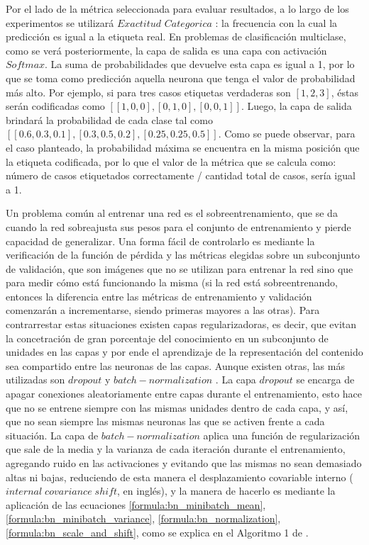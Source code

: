 
 Por el lado de la métrica seleccionada para evaluar resultados, a lo largo de los experimentos se utilizará \(Exactitud\) \(Categorica\) \cite{balanced_accuracy_score}: la frecuencia con la cual la predicción es igual a la etiqueta real. En problemas de clasificación multiclase, como se verá posteriormente, la capa de salida es una capa con activación \(Softmax\). La suma de probabilidades que devuelve esta capa es igual a 1, por lo que se toma como predicción aquella neurona que tenga el valor de probabilidad más alto. 
 Por ejemplo, si para tres casos etiquetas verdaderas son \([1, 2, 3]\), éstas serán codificadas como \([[1, 0, 0], [0, 1, 0], [0, 0, 1]]\). Luego, la capa de salida brindará la probabilidad de cada clase tal como \([[0.6, 0.3, 0.1], [0.3, 0.5, 0.2], [0.25, 0.25, 0.5]]\). Como se puede observar, para el caso planteado, la probabilidad máxima se encuentra en la misma posición que la etiqueta codificada, por lo que el valor de la métrica que se calcula como: número de casos etiquetados correctamente / cantidad total de casos, sería igual a 1.


 Un problema común al entrenar una red es el sobreentrenamiento, que se da cuando la red sobreajusta sus pesos para el conjunto de entrenamiento y pierde capacidad de generalizar. Una forma fácil de controlarlo es mediante la verificación de la función de pérdida y las métricas elegidas sobre un subconjunto de validación, que son imágenes que no se utilizan para entrenar la red sino que para medir cómo está funcionando la misma (si la red está sobreentrenando, entonces la diferencia entre las métricas de entrenamiento y validación comenzarán a incrementarse, siendo primeras mayores a las otras). Para contrarrestar estas situaciones existen capas regularizadoras, es decir, que evitan la concetración de gran porcentaje del conocimiento en un subconjunto de unidades en las capas y por ende el aprendizaje de la representación del contenido sea compartido entre las neuronas de las capas. Aunque existen otras, las más utilizadas son \(dropout\) \cite{baldi2013understanding} y \(batch-normalization\) \cite{BatchNorm}. La capa \(dropout\) se encarga de apagar conexiones aleatoriamente entre capas durante el entrenamiento, esto hace que no se entrene siempre con las mismas unidades dentro de cada capa, y así, que no sean siempre las mismas neuronas las que se activen frente a cada situación. La capa de \(batch-normalization\) aplica una función de regularización que sale de la media y la varianza de cada iteración durante el entrenamiento, agregando ruido en las activaciones y evitando que las mismas no sean demasiado altas ni bajas, reduciendo de esta manera el desplazamiento covariable interno (\(internal\;covariance\; shift\), en inglés), y la manera de hacerlo es mediante la aplicación de las ecuaciones \ref{formula:bn_minibatch_mean}, \ref{formula:bn_minibatch_variance}, \ref{formula:bn_normalization}, \ref{formula:bn_scale_and_shift}, como se explica en el Algoritmo 1 de \cite{BatchNorm}.
 
